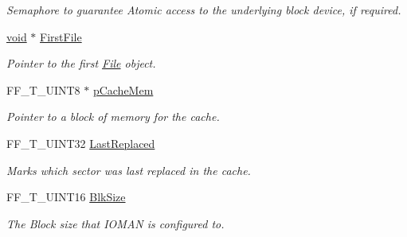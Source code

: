 \begin{DoxyCompactItemize}
\begin{DoxyCompactList}\small\item\em Semaphore to guarantee Atomic access to the underlying block device, if required. \end{DoxyCompactList}\item 
\mbox{\label{struct_f_f___i_o_m_a_n_a31da4eb1719d86e7a20a87cc4953c328}} 
\hyperlink{interfacevoid}{void} $\ast$ \hyperlink{struct_f_f___i_o_m_a_n_a31da4eb1719d86e7a20a87cc4953c328}{First\+File}
\begin{DoxyCompactList}\small\item\em Pointer to the first \hyperlink{class_file}{File} object. \end{DoxyCompactList}\item 
\mbox{\label{struct_f_f___i_o_m_a_n_a76bd178dee1d2deac19d471d82f204c8}} 
F\+F\+\_\+\+T\+\_\+\+U\+I\+N\+T8 $\ast$ \hyperlink{struct_f_f___i_o_m_a_n_a76bd178dee1d2deac19d471d82f204c8}{p\+Cache\+Mem}
\begin{DoxyCompactList}\small\item\em Pointer to a block of memory for the cache. \end{DoxyCompactList}\item 
\mbox{\label{struct_f_f___i_o_m_a_n_aeee468025c8b1cab5c7370c403c93779}} 
F\+F\+\_\+\+T\+\_\+\+U\+I\+N\+T32 \hyperlink{struct_f_f___i_o_m_a_n_aeee468025c8b1cab5c7370c403c93779}{Last\+Replaced}
\begin{DoxyCompactList}\small\item\em Marks which sector was last replaced in the cache. \end{DoxyCompactList}\item 
\mbox{\label{struct_f_f___i_o_m_a_n_a31f61a84ae732cff7f3a5f50feae5f8e}} 
F\+F\+\_\+\+T\+\_\+\+U\+I\+N\+T16 \hyperlink{struct_f_f___i_o_m_a_n_a31f61a84ae732cff7f3a5f50feae5f8e}{Blk\+Size}
\begin{DoxyCompactList}\small\item\em The Block size that I\+O\+M\+AN is configured to. \end{DoxyCompactList}\item 
\mbox{\label{struct_f_f___i_o_m_a_n_a665d1e4cb234f2da085508e92a6c7188}} 

\end{DoxyCompactItemize}

